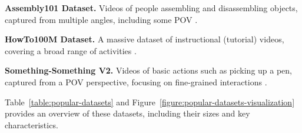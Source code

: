 \noindent\textbf{Assembly101 Dataset.} Videos of people assembling and disassembling objects, captured from multiple angles, including some POV \cite{assembly101-dataset}.

\noindent\textbf{HowTo100M Dataset.} A massive dataset of instructional (tutorial) videos, covering a broad range of activities \cite{howto100m-dataset}.

\noindent\textbf{Something-Something V2.} Videos of basic actions such as picking up a pen, captured from a POV perspective, focusing on fine-grained interactions \cite{something-something-dataset}.



Table~\ref{table:popular-datasets} and Figure~\ref{figure:popular-datasets-visualization} provides an overview of these datasets, including their sizes and key characteristics.